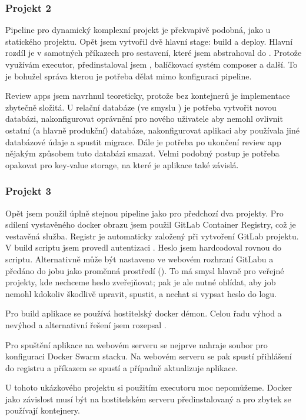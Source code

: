         \newpage
        \subsubsection{Projekt 2}
            Pipeline pro dynamický komplexní projekt je překvapivě podobná, jako u statického projektu. Opět jsem vytvořil dvě hlavní stage: build a deploy. Hlavní rozdíl je v samotných příkazech pro sestavení, které jsem abstrahoval do . Protože využívám  executor, předinstaloval jsem , balíčkovací systém composer a další. To je bohužel správa kterou je potřeba dělat mimo konfiguraci pipeline.

            Review apps jsem navrhnul teoreticky, protože bez kontejnerů je implementace zbytečně složitá. U relační databáze (ve smyslu ) je potřeba vytvořit novou databázi, nakonfigurovat oprávnění pro nového uživatele aby nemohl ovlivnit ostatní (a hlavně produkční) databáze, nakonfigurovat aplikaci aby používala jiné databázové údaje a spustit migrace. Dále je potřeba po ukončení review app nějakým způsobem tuto databázi smazat. Velmi podobný postup je potřeba opakovat pro key-value storage, na které je aplikace také závislá.

        \subsubsection{Projekt 3}
            Opět jsem použil úplně stejnou pipeline jako pro předchozí dva projekty. Pro sdílení vystavěného docker obrazu jsem použil GitLab Container Registry, což je vestavěná služba. Registr je automaticky založený při vytvoření GitLab projektu. V build scriptu jsem provedl autentizaci . Heslo jsem hardcodoval rovnou do scriptu. Alternativně může být nastaveno ve webovém rozhraní GitLabu a předáno do jobu jako proměnná prostředí (). To má smysl hlavně pro veřejné projekty, kde nechceme heslo zveřejňovat; pak je ale nutné ohlídat, aby \CI job nemohl kdokoliv škodlivě upravit, spustit, a nechat si vypsat heslo do logu.

            Pro build aplikace se používá hostitelský docker démon. Celou řadu výhod a nevýhod a alternativní řešení jsem rozepsal .

            Pro spuštění aplikace na webovém serveru se nejprve nahraje soubor pro konfiguraci Docker Swarm stacku. Na webovém serveru se pak spustí přihlášení do registru a příkazem  se spustí a případně aktualizuje aplikace.

            U tohoto ukázkového projektu si použitím  executoru moc nepomůžeme. Docker jako závislost musí být na hostitelském serveru předinstalovaný a pro zbytek se používají kontejnery.

